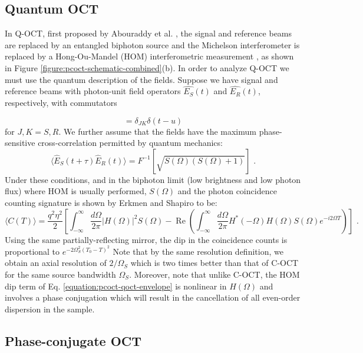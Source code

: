 \subsection{Quantum OCT}

In Q-OCT, first proposed by Abouraddy et al. \cite{abouraddy-qoct}, the signal and reference beams are replaced by an entangled biphoton source and the Michelson interferometer is replaced by a Hong-Ou-Mandel (HOM) interferometric measurement \cite{hong-measurement}, as shown in Figure \ref{figure:pcoct-schematic-combined}(b). In order to analyze Q-OCT we must use the quantum description of the fields. Suppose we have signal and reference beams with photon-unit field operators $\hat{E_S}(t)$ and $\hat{E_R}(t)$, respectively, with commutators

\begin{equation}
[ \hat{E_J}(t), \hat{E_K}^\dagger(u) ] = \delta_{JK} \delta(t-u)
\end{equation}
for $J, K = S, R$. We further assume that the fields have the maximum phase-sensitive cross-correlation permitted by quantum mechanics:
\begin{equation}
\langle \hat{E}_S(t+\tau) \hat{E}_R(t) \rangle = F^{-1} [\sqrt{S(\Omega)(S(\Omega) +1)}]\,\,.
\end{equation}
Under these conditions, and in the biphoton limit (low brightness and low photon flux) where HOM is usually performed, $S(\Omega)$ and the photon coincidence counting signature is shown by Erkmen and Shapiro \cite{erkmen-pcoct} to be:
\begin{equation}
\langle C(T) \rangle = \frac{q^2\eta^2}{2} \left[ \int_{-\infty}^{\infty} \frac{d\Omega}{2\pi} |H(\Omega)|^2 S(\Omega) - \operatorname{Re}\left( \int_{-\infty}^{\infty} \frac{d\Omega}{2\pi} H^*(-\Omega)H(\Omega)S(\Omega)e^{-i2\Omega T} \right) \right]\,\,.
\label{equation:pcoct-qoct-envelope}
\end{equation}
Using the same partially-reflecting mirror, the dip in the coincidence counts is proportional to  $e^{-2\Omega_S^2 (T_0 - T)^2}$ Note that by the same resolution definition, we obtain an axial resolution of $2/\Omega_S$ which is two times better than that of C-OCT for the same source bandwidth $\Omega_S$. Moreover, note that unlike C-OCT, the HOM dip term of Eq. \ref{equation:pcoct-qoct-envelope} is nonlinear in $H(\Omega)$ and involves a phase conjugation which will result in the cancellation of all even-order dispersion in the sample.

\subsection{Phase-conjugate OCT}

